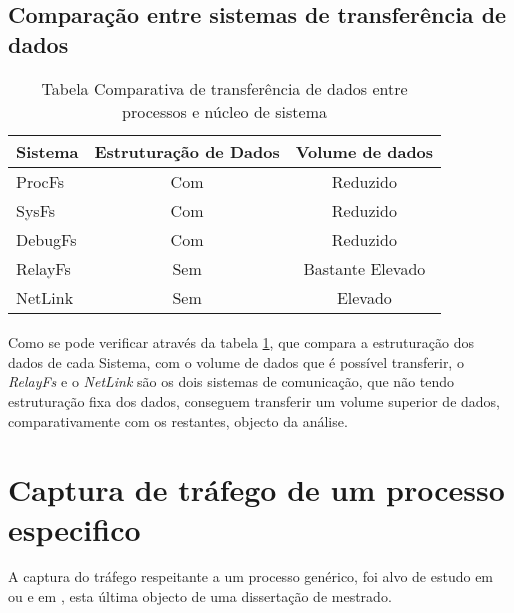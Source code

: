 \subsection{Comparação entre sistemas de transferência de dados}
\begin{table}[h]
\begin{center}

\begin{tabular}{|l||c|c|}
\hline
Sistema & Estruturação de Dados & Volume de dados \\
\hline
ProcFs & Com & Reduzido \\
\hline
SysFs & Com & Reduzido \\
\hline
DebugFs & Com & Reduzido \\
\hline
RelayFs & Sem & Bastante Elevado \\
\hline
NetLink & Sem & Elevado \\
\hline
\end{tabular}
\caption{Tabela Comparativa de transferência de dados entre processos e núcleo de sistema}
\label{tab:transf_compare}
\end{center}
\end{table}

\paragraph*{}
Como se pode verificar através da tabela \ref{tab:transf_compare}, que compara a estruturação dos dados de cada Sistema, com o volume de dados que é possível transferir, o \textit{RelayFs} e o \textit{NetLink} são os dois sistemas de comunicação, que não tendo estruturação fixa dos dados, conseguem transferir um volume superior de dados, comparativamente com os restantes, objecto da análise.

 
\section{Captura de tráfego de um processo especifico}
\label{sect:outras_abordagens}

A captura do tráfego respeitante a um processo genérico, foi alvo de estudo em \cite{1688981} ou e em \cite{Farruca:2009}, esta última objecto de uma dissertação de mestrado.

